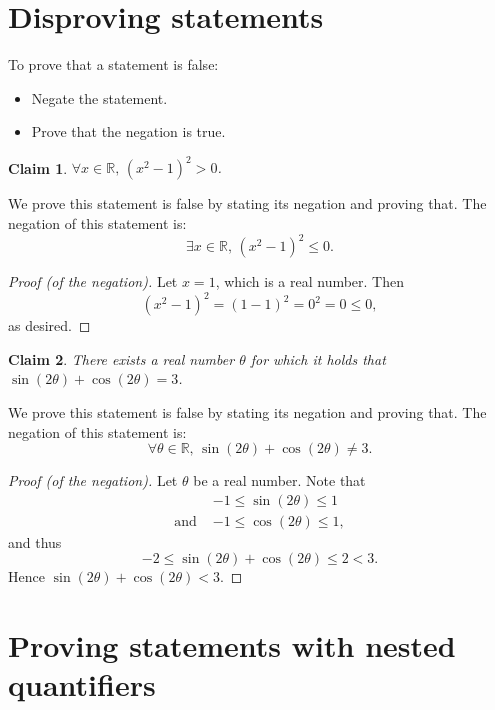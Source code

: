 \documentclass[11pt]{article}
\theoremstyle{plain}
\newtheorem*{claim}{Claim}
\theoremstyle{plain}
\theoremstyle{remark}
\def\reals{\mathbb{R}}
\begin{document}
\section*{Disproving statements}

To prove that a statement is false:
\begin{itemize}
 \item Negate the statement.
 \item Prove that the negation is true.
\end{itemize}



\begin{tcolorbox}
\begin{claim}
 $\forall x\in\reals,\, (x^2-1)^2>0$.
\end{claim}
\end{tcolorbox}
We prove this statement is false by stating its negation and proving that. The negation of this statement is:
\[
 \exists x\in\reals,\, (x^2-1)^2\leq0.
\]

\begin{proof}[Proof (of the negation)]
 Let $x=1$, which is a real number. Then
 \[
  (x^2-1)^2 = (1-1)^2 = 0^2 = 0 \leq 0,
  \]
as desired.
\end{proof}

\begin{tcolorbox}
\begin{claim}
 There exists a real number $\theta$ for which it holds that $\sin(2\theta)+\cos(2\theta)=3$.
\end{claim}
\end{tcolorbox}
We prove this statement is false by stating its negation and proving that. The negation of this statement is:
\[
 \forall\theta\in\reals,\, \sin(2\theta)+\cos(2\theta)\neq3.
\]
\begin{proof}[Proof (of the negation)]
 Let $\theta$ be a real number. Note that
 \begin{align*}
 &-1\leq \sin(2\theta)\leq 1\\ \text{and }&-1\leq \cos(2\theta)\leq 1,
 \end{align*}
and thus 
\[
 -2 \leq \sin(2\theta)+\cos(2\theta) \leq 2 <3.
\]
Hence $\sin(2\theta)+\cos(2\theta) < 3$.
\end{proof}

\section*{Proving statements with nested quantifiers}
\end{document}
